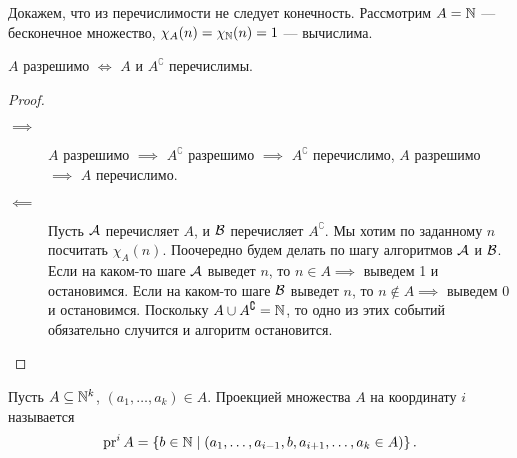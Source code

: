 Докажем, что из перечислимости не следует конечность.
Рассмотрим $A = \N$ --- бесконечное множество, $\chi_{A}(n) = \chi_{\N}(n) = 1$ --- вычислима.

\begin{theorem}[Поста]
    $A$ разрешимо $\iff$ $A$ и $A^{\complement}$ перечислимы.
\end{theorem}
\begin{proof}~
    \begin{description}
        \item[$\implies$] $A$ разрешимо $\implies$ $A^{\complement}$ разрешимо $\implies$ $A^{\complement}$ перечислимо, \hspace{5pt} $A$ разрешимо $\implies$ $A$ перечислимо.
        \item[$\impliedby$] Пусть $\AA$ перечисляет $A$, и $\BB$ перечисляет $A^{\complement}$.
        Мы хотим по заданному $n$ посчитать $\chi_{A}\left(n\right)$.
        Поочередно будем делать по шагу алгоритмов $\AA$ и $\BB$.
        Если на каком-то шаге $\AA$ выведет $n$, то $n \in A \implies$ выведем 1 и остановимся.
        Если на каком-то шаге $\BB$ выведет $n$, то $n \notin A \implies$ выведем 0 и остановимся.
        Поскольку $A \cup A^{\complement} = \N$, то одно из этих событий обязательно случится и алгоритм остановится.
        \qedhere
    \end{description}
\end{proof}

\begin{definition}
    Пусть $A \subseteq \N^{k}$, $\left(a_{1}, \ldots, a_{k}\right) \in A$.
    Проекцией множества $A$ на координату $i$ называется
    $$
        \pr^{i} A = \left\{b \in \N \mid \left(a_{1}, \ldots, a_{i - 1}, b, a_{i + 1}, \ldots, a_{k} \in A\right)\right\}.
    $$
\end{definition}

